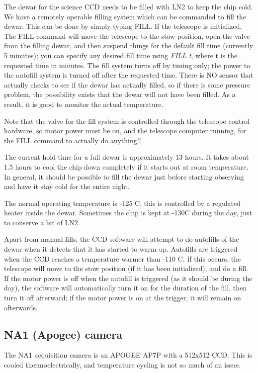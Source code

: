 \documentclass[10pt]{report}
\begin{document}
The dewar for the science CCD needs to be filled with LN2 to keep
the chip cold. We have a remotely operable filling system which can
be commanded to fill the dewar. This can be done by simply typing
FILL. If the telescope is initialized, The FILL command will move
the telescope to the stow position, open the valve from the filling
dewar, and then suspend things for the default fill time (currently
5 minutes); you can specify any desired fill time using \textit{FILL
t}, where t is the requested time in minutes.  The fill system turns
off by timing only; the power to the autofill system is turned off
after the requested time. There is NO sensor that actually checks
to see if the dewar has actually filled, so if there is some pressure
problem, the possibility exists that the dewar will not have been
filled.  As a result, it is good to monitor the actual temperature.

Note that the valve for the fill system is controlled through the
telescope control hardware, so motor power must be on, and the telescope
computer running, for the FILL command to actually do anything!!

The current hold time for a full dewar is approximately 13 hours. It takes
about 1.5 hours to cool the chip down completely if it starts out at
room temperature. In general, it should be possible to fill the dewar just
before starting observing and have it stay cold for the entire night.

The normal operating temperature is -125 C; this is controlled by a
regulated heater inside the dewar. Sometimes the chip is kept
at -130C during the day, just to conserve a bit of LN2.

Apart from manual fills, the CCD software will attempt to do autofills
of the dewar when it detects that it has started to warm up. Autofills
are triggered when the CCD reaches a temperature warmer than -110
C.  If this occurs, the telescope will move to the stow position
(if it has been initialized), and do a fill. If the motor power is
off when the autofill is triggered (as it should be during the day),
the software will automatically turn it on for the duration of the
fill, then turn it off afterward; if the motor power is on at the
trigger, it will remain on afterwards.

\subsection{NA1 (Apogee) camera}

The NA1 acquisition camera is an APOGEE AP7P with a 512x512 CCD. This
is cooled thermoelectrically, and temperature cycling is not so much
of an issue.
\end{document}
